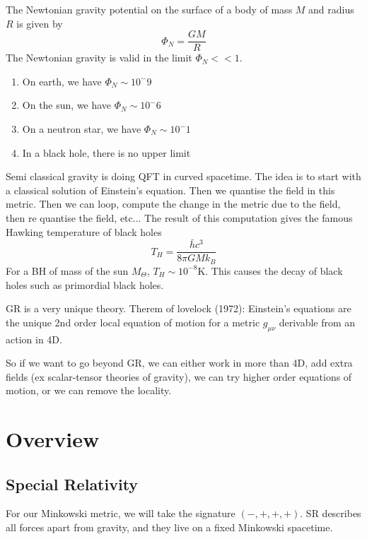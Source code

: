 \documentclass[a4paper]{book}
\theoremstyle{definition}
\theoremstyle{remark}
\begin{document}
The Newtonian gravity potential on the surface of a body of mass $M$ and radius $R$ is given by 
\begin{equation}
    \Phi_N = \frac{GM}{R}
\end{equation}
The Newtonian gravity is valid in the limit $\Phi_N << 1$. 
\begin{enumerate}
    \item On earth, we have $\Phi_N \sim 10^-9$
    \item On the sun, we have $\Phi_N \sim 10^-6$
    \item On a neutron star, we have $\Phi_N \sim 10^-1$
    \item In a black hole, there is no upper limit
\end{enumerate}\bigskip \par \medskip 

Semi classical gravity is doing QFT in curved spacetime. The idea is to start with a classical solution of Einstein's equation. Then we quantise the field in this metric. Then we can loop, compute the change in the metric due to the field, then re quantise the field, etc... The result of this computation gives the famous Hawking temperature of black holes 
\begin{equation}
    T_H = \frac{\bar{h}c^3}{8\pi GMk_B}
\end{equation}
For a BH of mass of the sun $M_\Theta$, $T_H \sim 10^{-8}$K. This causes the decay of black holes such as primordial black holes.\par \medskip 

GR is a very unique theory. Therem of lovelock (1972): Einstein's equations are the unique 2nd order local equation of motion for a metric $g_{\mu\nu}$ derivable from an action in 4D. \par 

So if we want to go beyond GR, we can either work in more than 4D, add extra fields (ex scalar-tensor theories of gravity), we can try higher order equations of motion, or we can remove the locality. 
\chapter{Overview}
\section{Special Relativity}

For our Minkowski metric, we will take the signature $(-, +, +, +)$. SR describes all forces apart from gravity, and they live on a fixed Minkowski spacetime. \par \medskip 
\end{document}
